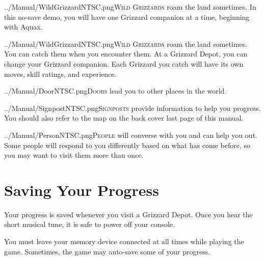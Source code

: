 \documentclass[10pt,twocolumn,openany,article]{memoir}
\begin{document}
\ifdefined\NOSAVE

\lettrine[image=true,                lines=5,               findent=3pt,
nindent=3pt]{../Manual/WildGrizzardNTSC.png}{Wild  Grizzards}   roam  the
land  sometimes.  In this  no-save  demo,  you  will have  one  Grizzard
companion at a time, beginning with Aquax.

\else

\lettrine[image=true,                lines=5,               findent=3pt,
nindent=3pt]{../Manual/WildGrizzardNTSC.png}{Wild  Grizzards}   roam  the
land  sometimes.   You  can   catch  them   when  you   encounter  them.
At  a   Grizzard  Depot,  you   can  change  your   Grizzard  companion.
Each  Grizzard  you  catch  will  have its  own  moves,  skill  ratings,
and experience.

\fi

\ifdefined\ATARIAGESAVE\pagebreak\fi

\lettrine[image=true,                lines=5,               findent=3pt,
nindent=3pt]{../Manual/DoorNTSC.png}{Doors} lead  you to other  places in
the world.

\vspace{30pt}

\lettrine[image=true,                lines=5,               findent=3pt,
nindent=3pt]{../Manual/SignpostNTSC.png}{Signposts}  provide  information
to  help  you  progress.  You  should  also refer  to  the  map  on  the
\ifdefined\ATARIAGESAVE back cover \else last page \fi{} of this manual.

\ifdefined\ATARIAGESAVE\else\vspace{30pt}\fi

\lettrine[image=true,                lines=5,               findent=3pt,
nindent=3pt]{../Manual/PersonNTSC.png}{People} will converse with you and
can help you  out. Some people will respond to  you differently based on
what has come before, so you may want to visit them more than once.


\ifdefined\NOSAVE\else

\section{Saving Your Progress}

Your progress  is saved whenever  you visit  a Grizzard Depot.  Once you
hear the short musical tune, it is safe to power off your console.

\ifdefined\ATARIAGESAVE\else

You must leave  your memory device connected at all  times while playing
the game. Sometimes, the game may auto-save some of your progress.
\end{document}
